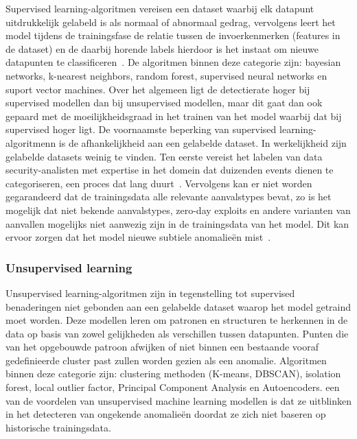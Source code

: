Supervised learning-algoritmen vereisen een dataset waarbij elk datapunt uitdrukkelijk gelabeld is als normaal of abnormaal gedrag, vervolgens leert het model tijdens de trainingsfase de relatie tussen de invoerkenmerken (features in de dataset) en de daarbij horende labels hierdoor is het instaat om nieuwe datapunten te classificeren~\autocite{Saabith2023}. 
De algoritmen binnen deze categorie zijn: bayesian networks, k-nearest neighbors, random forest, supervised neural networks en suport vector machines. Over het algemeen ligt de detectierate hoger bij supervised modellen dan bij unsupervised modellen, maar dit gaat dan ook gepaard met de moeilijkheidsgraad in het trainen van het model waarbij dat bij supervised hoger ligt\autocite{Kumari2024}. 
De voornaamste beperking van supervised learning-algoritmenn is de afhankelijkheid aan een gelabelde dataset. In werkelijkheid zijn gelabelde datasets weinig te vinden. Ten eerste vereist het labelen van data security-analisten met expertise in het domein dat duizenden events dienen te categoriseren, een proces dat lang duurt~\autocite{Kumar_2025}. 
Vervolgens kan er niet worden gegarandeerd dat de trainingsdata alle relevante aanvalstypes bevat, zo is het mogelijk dat niet bekende aanvalstypes, zero-day exploits en andere varianten van aanvallen mogelijks niet aanwezig zijn in de trainingsdata van het model. Dit kan ervoor zorgen dat het model nieuwe subtiele anomalieën mist~\autocite{Kumari2024}.

\subsubsection{Unsupervised learning}

Unsupervised learning-algoritmen zijn in tegenstelling tot supervised benaderingen niet gebonden aan een gelabelde dataset waarop het model getraind moet worden. Deze modellen leren om patronen en structuren te herkennen in de data op basis van zowel gelijkheden als verschillen tussen datapunten. Punten die van het opgebouwde patroon afwijken of niet binnen een bestaande vooraf gedefinieerde  cluster past zullen worden gezien als een anomalie\textcite{Saabith2023}. 
Algoritmen binnen deze categorie zijn: clustering methoden (K-means, DBSCAN), isolation forest, local outlier factor, Principal Component Analysis en Autoencoders. een van de voordelen van unsupervised machine learning modellen is dat ze uitblinken in het detecteren van ongekende anomalieën doordat ze zich niet baseren op historische trainingsdata\autocite{Kumari2024}.

